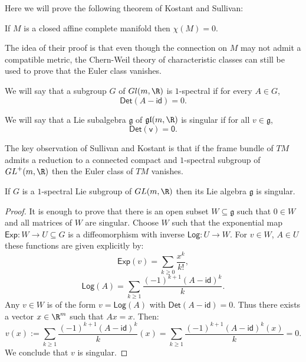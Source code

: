Here we will prove the following theorem of Kostant and Sullivan:

\begin{theoremnn}\label{Theocomplete}
	If $M$ is a closed affine complete manifold then $\chi(M)=0$.	
\end{theoremnn}

The idea of their proof is that even though the connection on $M$ may not admit a compatible metric, the Chern-Weil theory of characteristic classes can still be used to prove that the Euler class vanishes.


\begin{definition}
	We will say that a subgroup $G$ of ${Gl}(m,\R)$ is $1$-spectral if for every $ A \in G$, \[\mathsf{Det}(A-\mathsf{id})=0.\]
\end{definition}

\begin{definition}
	We will say that a Lie subalgebra $\mathfrak{g}$ of $\mathfrak{gl}(m,\R)$ is singular if for all $v \in \mathfrak{g}$,
	\[ \mathsf{Det(v)=0}.\]
\end{definition}

The key observation of Sullivan and Kostant is that if the frame bundle of $TM$ admits a reduction to a connected compact and $1$-spectral subgroup of ${GL}^+(m,\R)$ then the Euler class of $TM$ vanishes.


\begin{lemma}
	If $G$ is a $1$-spectral Lie subgroup of ${GL}(m,\R)$ then its Lie algebra $\mathfrak{g}$ is singular.
\end{lemma}
\begin{proof}
	It is enough to prove that there is an open subset  $W\subseteq \mathfrak{g}$ such that $0\in W$  and all matrices of $W$ are singular.
	Choose $W$ such that the exponential map $\mathsf{Exp}:W \to U\subseteq G$ is a diffeomorphism with inverse $\mathsf{Log}: U\to W$. For $v\in W$, $A\in U$ these functions are given explicitly by:
	$$\mathsf{Exp}(v)=\sum_{k\geqslant0} \frac{x^{k}}{k!},$$
	$$\mathsf{Log}(A)=\sum_{k\geqslant 1} \frac{(-1)^{k+1}(A-\mathsf{id})^{k}}{k}.$$
	Any $v \in W$ is of the form $v=\mathsf{Log}(A)$ with $\mathsf{Det}(A-\mathsf{id})=0.$ Thus there exists a vector $x \in \R^m$ such that $Ax=x$. Then:
	\[v(x):=\sum_{k\geqslant 1} \frac{(-1)^{k+1}(A-\mathsf{id})^{k}}{k} (x)=\sum_{k\geqslant 1} \frac{(-1)^{k+1}(A-\mathsf{id})^{k}(x)}{k}=0.\]
	We conclude that $v$ is singular.
\end{proof}

